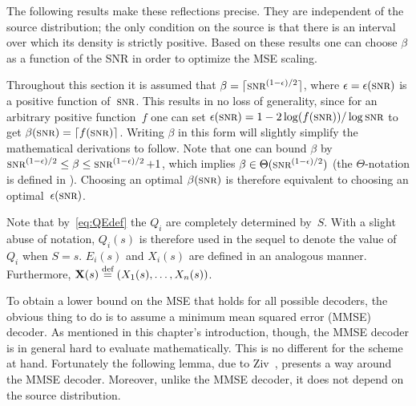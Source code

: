 The following results make these reflections precise. They are independent of
the source distribution; the only condition on the source is that there is an
interval over which its density is strictly positive. Based on these results one
can choose $\beta$ as a function of the SNR in order to optimize the MSE
scaling. 

\begin{remark}
  \label{rem:betaepswlog}
  Throughout this section it is assumed that $\beta = \lceil
  \snr^{(1-\e)/2}\rceil$, where $\e = \e(\snr)$ is a positive function
  of~$\snr$. This results in no loss of generality, since for an arbitrary
  positive function~$f$ one can set $\e(\snr) = 1-2 \log(f(\snr))/\log\snr$ to
  get $\beta(\snr) = \lceil f(\snr) \rceil$.  Writing $\beta$ in this form will
  slightly simplify the mathematical derivations to follow. Note that one can
  bound $\beta$ by $\snr^{(1-\e)/2} \le \beta \le \snr^{(1-\e)/2} + 1$, which
  implies $\beta \in \Theta(\snr^{(1-\e)/2})$ (the $\Theta$-notation is defined
  in ). Choosing an optimal $\beta(\snr)$ is therefore
  equivalent to choosing an optimal~$\e(\snr)$.
\end{remark}

\begin{remark}
  \label{rem:functionnotation}
  Note that by~\eqref{eq:QEdef} the $Q_i$ are completely determined by~$S$.
  With a slight abuse of notation, $Q_i(s)$ is therefore used in the sequel to
  denote the value of~$Q_i$ when $S = s$. $E_i(s)$ and $X_i(s)$ are defined in
  an analogous manner. Furthermore, $\mathbf{X}(s) \stackrel{\text{def}}{=} (X_1(s), \dots, X_n(s))$.
\end{remark}


To obtain a lower bound on the MSE that holds for all possible decoders, the
obvious thing to do is to assume a minimum mean squared error (MMSE) decoder. As
mentioned in this chapter's introduction, though, the MMSE decoder is in general
hard to evaluate mathematically. This is no different for the scheme at hand.
Fortunately the following lemma, due to Ziv~\cite{Ziv1970}, presents a way
around the MMSE decoder. Moreover, unlike the MMSE decoder, it does not depend
on the source distribution.


